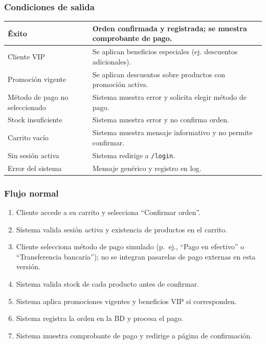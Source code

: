 \documentclass[12pt,a4paper]{article}
\begin{document}
\subsubsection*{Condiciones de salida}
\begin{longtable}{|l|p{10cm}|}
    \hline
    Éxito                          & Orden confirmada y registrada; se muestra comprobante de pago. \\ \hline
    Cliente VIP                    & Se aplican beneficios especiales (ej. descuentos adicionales). \\ \hline
    Promoción vigente              & Se aplican descuentos sobre productos con promoción activa.    \\ \hline
    Método de pago no seleccionado & Sistema muestra error y solicita elegir método de pago.        \\ \hline
    Stock insuficiente             & Sistema muestra error y no confirma orden.                     \\ \hline
    Carrito vacío                  & Sistema muestra mensaje informativo y no permite confirmar.    \\ \hline
    Sin sesión activa              & Sistema redirige a \texttt{/login}.                            \\ \hline
    Error del sistema              & Mensaje genérico y registro en log.                            \\ \hline
\end{longtable}

\subsubsection*{Flujo normal}
\begin{enumerate}[label=FN-\arabic*]
    \item Cliente accede a su carrito y selecciona “Confirmar orden”.
    \item Sistema valida sesión activa y existencia de productos en el carrito.
    \item Cliente selecciona método de pago simulado (p.~ej., ``Pago en efectivo'' o ``Transferencia bancaria''); no se integran pasarelas de pago externas en esta versión.
    \item Sistema valida stock de cada producto antes de confirmar.
    \item Sistema aplica promociones vigentes y beneficios VIP si corresponden.
    \item Sistema registra la orden en la BD y procesa el pago.
    \item Sistema muestra comprobante de pago y redirige a página de confirmación.
\end{enumerate}
\end{document}
